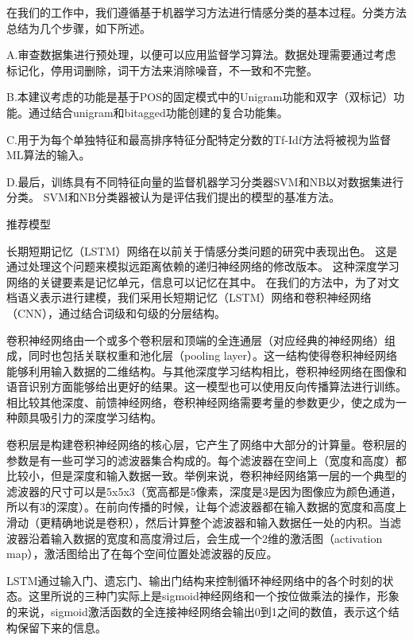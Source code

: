 \documentclass[a4paper,AutoFakeBold,oneside,12pt]{book}
\begin{document}
在我们的工作中，我们遵循基于机器学习方法进行情感分类的基本过程。分类方法总结为几个步骤，如下所述。

A.审查数据集进行预处理，以便可以应用监督学习算法。数据处理需要通过考虑标记化，停用词删除，词干方法来消除噪音，不一致和不完整。

B.本建议考虑的功能是基于POS的固定模式中的Unigram功能和双字（双标记）功能。通过结合unigram和bitagged功能创建的复合功能集。

C.用于为每个单独特征和最高排序特征分配特定分数的Tf-Idf方法将被视为监督ML算法的输入。

D.最后，训练具有不同特征向量的监督机器学习分类器SVM和NB以对数据集进行分类。 SVM和NB分类器被认为是评估我们提出的模型的基准方法。


推荐模型

长期短期记忆（LSTM）网络在以前关于情感分类问题的研究中表现出色。 这是通过处理这个问题来模拟远距离依赖的递归神经网络的修改版本。 这种深度学习网络的关键要素是记忆单元，信息可以记忆在其中。 在我们的方法中，为了对文档语义表示进行建模，我们采用长短期记忆（LSTM）网络和卷积神经网络（CNN），通过结合词级和句级的分层结构。

卷积神经网络由一个或多个卷积层和顶端的全连通层（对应经典的神经网络）组成，同时也包括关联权重和池化层（pooling layer）。这一结构使得卷积神经网络能够利用输入数据的二维结构。与其他深度学习结构相比，卷积神经网络在图像和语音识别方面能够给出更好的结果。这一模型也可以使用反向传播算法进行训练。相比较其他深度、前馈神经网络，卷积神经网络需要考量的参数更少，使之成为一种颇具吸引力的深度学习结构。

卷积层是构建卷积神经网络的核心层，它产生了网络中大部分的计算量。卷积层的参数是有一些可学习的滤波器集合构成的。每个滤波器在空间上（宽度和高度）都比较小，但是深度和输入数据一致。举例来说，卷积神经网络第一层的一个典型的滤波器的尺寸可以是5x5x3（宽高都是5像素，深度是3是因为图像应为颜色通道，所以有3的深度）。在前向传播的时候，让每个滤波器都在输入数据的宽度和高度上滑动（更精确地说是卷积），然后计算整个滤波器和输入数据任一处的内积。当滤波器沿着输入数据的宽度和高度滑过后，会生成一个2维的激活图（activation map），激活图给出了在每个空间位置处滤波器的反应。

LSTM通过输入门、遗忘门、输出门结构来控制循环神经网络中的各个时刻的状态。这里所说的三种门实际上是sigmoid神经网络和一个按位做乘法的操作，形象的来说，sigmoid激活函数的全连接神经网络会输出0到1之间的数值，表示这个结构保留下来的信息。
\end{document}
